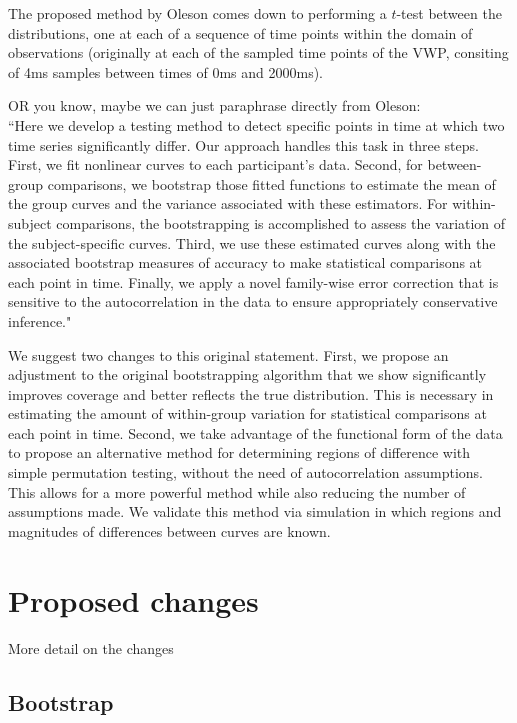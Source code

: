 \documentclass{article}
\begin{document}
The proposed method by Oleson comes down to performing a $t$-test between the distributions, one at each of a sequence of time points within the domain of observations (originally at each of the sampled time points of the VWP, consiting of 4ms samples between times of 0ms and 2000ms). 

OR you know, maybe we can just paraphrase directly from Oleson: \\

``Here we develop a testing method to detect specific points in time at which two time series significantly differ. Our approach handles this task in three steps. First, we fit nonlinear curves to each participant's data. Second, for between-group comparisons, we bootstrap those fitted functions to estimate the mean of the group curves and the variance associated with these estimators. For within-subject comparisons, the bootstrapping is accomplished to assess the variation of the subject-specific curves. Third, we use these estimated curves along with the associated bootstrap measures of accuracy to make statistical comparisons at each point in time. Finally, we apply a novel family-wise error correction that is sensitive to the autocorrelation in the data to ensure appropriately conservative inference."

We suggest two changes to this original statement. First, we propose an adjustment to the original bootstrapping algorithm that we show significantly improves coverage and better reflects the true distribution. This is necessary in estimating the amount of within-group variation for statistical comparisons at each point in time. Second, we take advantage of the functional form of the data to propose an alternative method for determining regions of difference with simple permutation testing, without the need of autocorrelation assumptions. This allows for a more powerful method while also reducing the number of assumptions made. We validate this method via simulation in which regions and magnitudes of differences between curves are known.

\section{Proposed changes}

More detail on the changes

\subsection{Bootstrap}
\end{document}

